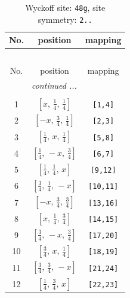 \documentclass[fleqn,8pt]{jsarticle}
\begin{document}
\renewcommand{\arraystretch}{1.2}
\begin{longtable}{ccc}
\caption{Wyckoff site: {\tt 48g}, site symmetry: {\tt 2..}}
 \\
 \hline \hline
No. & position & mapping \\ \hline \endfirsthead

\multicolumn{2}{l}{\tablename\ \thetable{}} \\
 \hline \hline
No. & position & mapping \\ \hline \endhead

 \hline \hline
\multicolumn{2}{r}{\footnotesize\it continued ...} \\ \endfoot

 \hline \hline
\multicolumn{2}{r}{} \\ \endlastfoot

1 & $\left[ x,\, \frac{1}{4},\, \frac{1}{4} \right]$ & {\tt [1,4]} \\ \hline
2 & $\left[ - x,\, \frac{3}{4},\, \frac{1}{4} \right]$ & {\tt [2,3]} \\ \hline
3 & $\left[ \frac{1}{4},\, x,\, \frac{1}{4} \right]$ & {\tt [5,8]} \\ \hline
4 & $\left[ \frac{1}{4},\, - x,\, \frac{3}{4} \right]$ & {\tt [6,7]} \\ \hline
5 & $\left[ \frac{1}{4},\, \frac{1}{4},\, x \right]$ & {\tt [9,12]} \\ \hline
6 & $\left[ \frac{3}{4},\, \frac{1}{4},\, - x \right]$ & {\tt [10,11]} \\ \hline
7 & $\left[ - x,\, \frac{3}{4},\, \frac{3}{4} \right]$ & {\tt [13,16]} \\ \hline
8 & $\left[ x,\, \frac{1}{4},\, \frac{3}{4} \right]$ & {\tt [14,15]} \\ \hline
9 & $\left[ \frac{3}{4},\, - x,\, \frac{3}{4} \right]$ & {\tt [17,20]} \\ \hline
10 & $\left[ \frac{3}{4},\, x,\, \frac{1}{4} \right]$ & {\tt [18,19]} \\ \hline
11 & $\left[ \frac{3}{4},\, \frac{3}{4},\, - x \right]$ & {\tt [21,24]} \\ \hline
12 & $\left[ \frac{1}{4},\, \frac{3}{4},\, x \right]$ & {\tt [22,23]} \\
\end{longtable}
\renewcommand{\arraystretch}{1.2}
\end{document}
